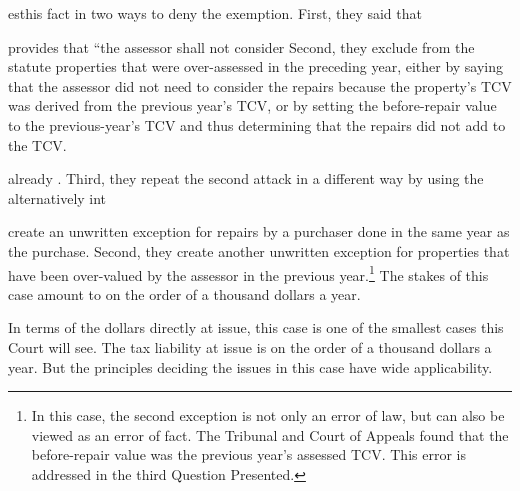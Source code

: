 \documentclass[12pt,\documentclassflag]{michiganCourtOfAppealsBrief}
\begin{document}
esthis fact in two ways to deny the exemption. First, they said that 

provides that ``the assessor shall not consider Second, they exclude from the statute properties that were over-assessed in the preceding year, either by saying that the assessor did not need to consider the repairs because the property's TCV was derived from the previous year's TCV, or by setting the before-repair value to the previous-year's TCV and thus determining that the repairs did not add to the TCV.


already  . Third, they repeat the second attack in a different way by using the alternatively int


create an unwritten exception for repairs by a purchaser done in the same year as the purchase. Second, they create another unwritten exception for properties that have been over-valued by the assessor in the previous year.\footnote{In this case, the second exception is not only an error of law, but can also be viewed as an error of fact. The Tribunal and Court of Appeals found that the before-repair value was the previous year's assessed TCV. This error is addressed in the third Question Presented.} 
The stakes of this case amount to on the order of a thousand dollars a year.

In terms of the dollars directly at issue, this case is one of the smallest cases this Court will see. The tax liability at issue is on the order of a thousand dollars a year. But the principles deciding the issues in this case have wide applicability.
\end{document}
